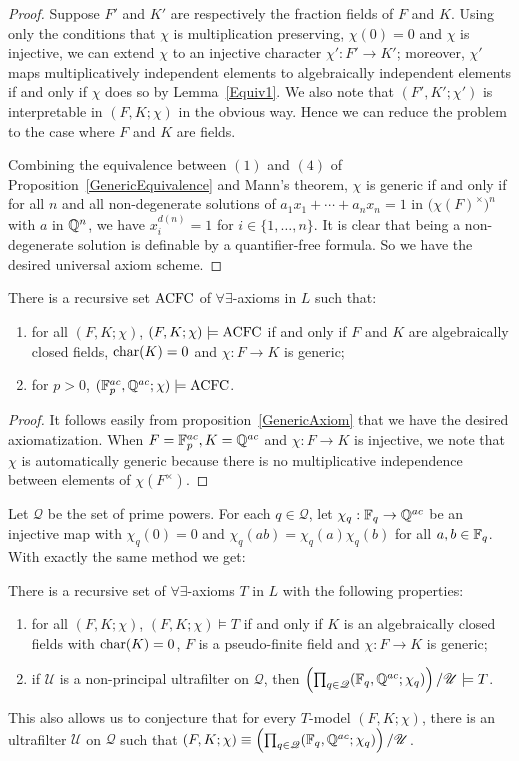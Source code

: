 \begin{proof}
Suppose $F'$ and $K'$ are respectively the fraction fields of $F$ and $K$.
Using only the conditions that $\chi$ is multiplication preserving, $\chi(0) =0$ and $\chi$ is injective, we can extend $\chi$ to an injective character $\chi': F' \to K'$; moreover, $\chi'$ maps multiplicatively independent elements to algebraically independent elements if and only if $\chi$ does so by Lemma~\ref{Equiv1}.
We also note that $(F', K'; \chi')$ is interpretable in $(F, K; \chi)$ in the obvious way.
Hence we can reduce the problem to the case where  $F$ and $K$ are fields.

 Combining  the equivalence between \((1)\) and \((4) \) of Proposition~\ref{GenericEquivalence} and Mann's theorem, \(\chi\) is generic if and only if for all $n$ and all non-degenerate solutions of $a_1x_1+\cdots+a_nx_n=1$ in \(\big(\chi(F)^\times\big)^n\) with $a$ in \(\mathbb{Q}^n\), we have \( x_i^{d(n)} =1 \) for \(i \in \{ 1, \ldots, n\}\).
It is clear that being a non-degenerate solution is definable by a quantifier-free formula.
So we have the desired universal axiom scheme.
\end{proof}

\begin{thm}
There is a recursive set $\mathrm{ACFC}$ of $\forall\exists$-axioms in $L$ such that:
\begin{enumerate}
\item for all $(F, K;\chi)$, $(F, K;\chi)\models \mathrm{ACFC}$ if and only if $F$ and $K$ are algebraically closed fields, $\mathrm{char}(K)=0$ and $\chi:F \to K$ is generic;
\item for $p>0$, $(\mathbb{F}_{p}^{ac}, \mathbb{Q}^{ac}; \chi)\models \mathrm{ACFC}$.
\end{enumerate}
\end{thm}

\begin{proof}
It follows easily from proposition~\ref{GenericAxiom} that we have the desired axiomatization. 
When $F= \mathbb{F}_{p}^{ac}, K = \mathbb{Q}^{ac}$ and $\chi: F \to K$ is injective, we note that $\chi$ is automatically generic because there is no multiplicative independence between elements of $\chi(F^\times)$.
\end{proof}

\noindent Let $\mathscr{Q}$ be the set of prime powers. For each $q \in \mathscr{Q} $, let $\chi_q: \mathbb{F}_q \to \mathbb{Q}^{ac}$ be an injective map with $\chi_q(0)=0$ and $\chi_q(ab)=\chi_q(a)\chi_q(b)$ for all $a,b\in \mathbb{F}_q$. With exactly the same method we get: 

\begin{prop}
There is a recursive set of $\forall\exists$-axioms $T$ in $L$ with the following properties:
\begin{enumerate}
\item for all $(F, K;\chi)$, $(F, K;\chi)\models T$ if and only if $K$ is an algebraically closed fields with $\mathrm{char}(K)=0$, $F$ is a pseudo-finite field and $\chi:F \to K$ is generic;
\item  if $\mathscr{U}$ is a non-principal ultrafilter on $\mathscr{Q}$, then $\left( \prod_{q \in \mathscr{Q}}(\mathbb{F}_q, \mathbb{Q}^{ac}; \chi_q) \right) \slash \mathscr{U} \models T$.
\end{enumerate}
\end{prop}

\noindent
This also allows us to conjecture that for every $T$-model $(F,K;\chi)$, there is an ultrafilter $\mathscr{U}$ on $\mathscr{Q}$ such that  $ (F,K;\chi) \equiv \left( \prod_{q \in \mathscr{Q}}(\mathbb{F}_q, \mathbb{Q}^{ac}; \chi_q) \right) \slash \mathscr{U}$.